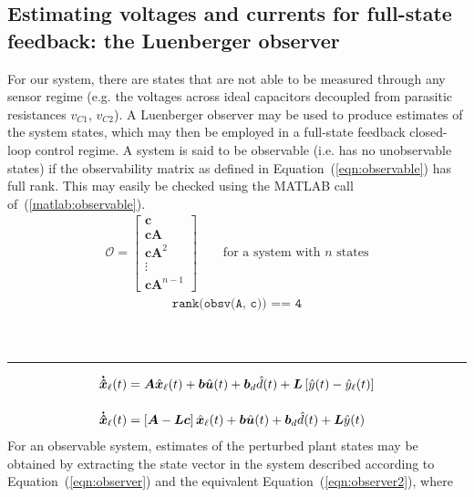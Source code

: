 \subsection{Estimating voltages and currents for full-state feedback: the Luenberger observer}
For our system, there are states that are not able to be measured through any sensor regime (e.g. the voltages across ideal capacitors decoupled from parasitic resistances $v_{C1}$, $v_{C2}$). A Luenberger observer may be used to produce estimates of the system states, which may then be employed in a full-state feedback closed-loop control regime.
\newpar
A system is said to be observable (i.e. has no unobservable states) if the observability matrix as defined in Equation~(\ref{eqn:observable}) has full rank. This may easily be checked using the \textsf{MATLAB} call of~(\ref{matlab:observable}).
\begin{align}
\mathcal{O}
=
\begin{bmatrix}
\boldsymbol{c} \\
\boldsymbol{c}\boldsymbol{A} \\
\boldsymbol{c}\boldsymbol{A}^2 \\
\vdots \\
\boldsymbol{c}\boldsymbol{A}^{n - 1}
\end{bmatrix}
\qquad
\text{for a system with } n \text{ states}
\label{eqn:observable}
\end{align}
%
\begin{align}
\texttt{rank(obsv(A, c)) == 4}
\label{matlab:observable}
\end{align}
~\\
~\rule{\textwidth}{0.5pt}
\begin{align}
\boldsymbol{\dot{\hat{x}}}_\ell (t) &= \boldsymbol{A}\hat{\boldsymbol{x}}_\ell(t) + \boldsymbol{b}\hat{\boldsymbol{u}}(t) + \boldsymbol{b}_d \hat{d}(t) + \boldsymbol{L}\left[\hat{y}(t) - \hat{y}_\ell(t)\right]
\label{eqn:observer}
\\[11pt]
\boldsymbol{\dot{\hat{x}}}_\ell (t) &= \left[\boldsymbol{A} - \boldsymbol{L}\boldsymbol{c}\right]\hat{\boldsymbol{x}}_\ell(t) + \boldsymbol{b}\hat{\boldsymbol{u}}(t) + \boldsymbol{b}_d \hat{d}(t) + \boldsymbol{L}\hat{y}(t)
\label{eqn:observer2}
\end{align}
For an observable system, estimates of the perturbed plant states may be obtained by extracting the state vector in the system described according to Equation~(\ref{eqn:observer}) and the equivalent Equation~(\ref{eqn:observer2}), where
